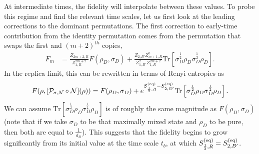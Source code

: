 \documentclass[a4paper,11pt]{article}
\newcommand{\Tr}{\text{Tr}}
\begin{document}
\begin{enumerate}
At intermediate times, the fidelity will interpolate between these values. To probe this regime and find the relevant time scales, let us first look at the leading corrections to the dominant permutations. The first correction to early-time contribution from the identity permutation comes from the permutation that swaps the first and $(m+2)^{th}$ copies,
\begin{align}
 F_m &= \frac{Z_{2m+2,R}}{Z_{1,R}^{2m + 2}}F(\rho_D, \sigma_D)+ \frac{Z_{2,B'}Z_{m+1,R}^2}{Z_{1,B'}^2Z_{1,R}^{2m + 2}} \Tr \left[ \sigma_D^{\frac{1}{2}}\rho_D \sigma_D^{\frac{1}{2}}\rho_D\right].
\end{align}
In the replica limit, this can be rewritten in terms of Renyi entropies as
\begin{align}
 F(\rho, [\mathcal{P}_{\sigma,\mathcal{N}}\circ \mathcal{N}](\rho)) = F(\rho_D,\sigma_D) + e^{S^{\rm (eq)}_{\frac{1}{2}, R}-S^{\rm (eq)}_{2,B'}}\Tr \left[ \sigma_D^{\frac{1}{2}}\rho_D \sigma_D^{\frac{1}{2}}\rho_D\right]. \label{finite_corr}
\end{align} 
We can assume $\Tr \left[ \sigma_D^{\frac{1}{2}}\rho_D \sigma_D^{\frac{1}{2}}\rho_D\right]$ is of roughly the same magnitude as $F(\rho_D, \sigma_D)$ (note that if we take $\sigma_D$ to be that maximally mixed state and $\rho_D$ to be pure, then both are equal to $\frac{1}{d_D}$). This suggests that the fidelity begins to grow significantly from its initial value at the time scale $t_b$, at which $S^{\rm (eq)}_{\frac{1}{2}, R} = S^{\rm (eq)}_{2,B'}$. 


\end{enumerate}
\end{document}
